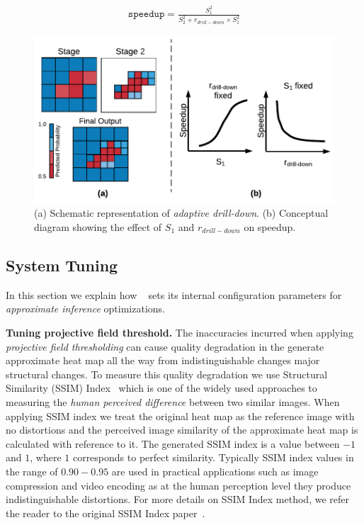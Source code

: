\begin{align}
\label{eqn:adaptive-drill-down-eqn}
\texttt{speedup} = \frac{S^2_1}{S^2_2+r_{drill-down} \times S^2_1}
\end{align}

\begin{figure}[t]
\includegraphics[width=\columnwidth]{images/adaptive_drill_down}
\caption{(a) Schematic representation of \textit{adaptive drill-down}. (b) Conceptual diagram showing the effect of $S_1$ and $r_{drill-down}$ on speedup. }
\label{fig:adaptive_drill_down}
\end{figure}

\subsection{System Tuning}
In this section we explain how \system~ sets its internal configuration parameters for \textit{approximate inference} optimizations.

\vspace{2mm}
\noindent \textbf{Tuning projective field threshold.}
The inaccuracies incurred when applying \textit{projective field thresholding} can cause quality degradation in the generate approximate heat map all the way from indistinguishable changes major structural changes.
To measure this quality degradation we use Structural Similarity (SSIM) Index~\cite{wang2004image} which is one of the widely used approaches to measuring the \textit{human perceived difference} between two similar images.
When applying SSIM index we treat the original heat map as the reference image with no distortions and the perceived image similarity of the approximate heat map is calculated with reference to it.
The generated SSIM index is a value between $-1$ and $1$, where $1$ corresponds to perfect similarity.
Typically SSIM index values in the range of $0.90-0.95$ are used in practical applications such as image compression and video encoding as at the human perception level they produce indistinguishable distortions.
For more details on SSIM Index method, we refer the reader to the original SSIM Index paper~\cite{wang2004image}.

